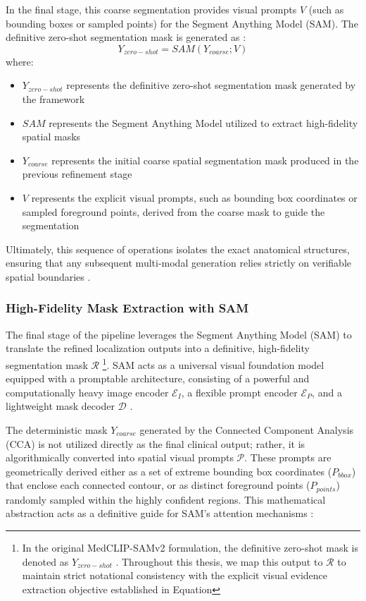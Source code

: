 In the final stage, this coarse segmentation provides visual prompts $V$ (such as bounding boxes or sampled points) for the Segment Anything Model (SAM). The definitive zero-shot segmentation mask is generated as \cite{medclipsam}:
\begin{equation}
Y_{zero-shot} = SAM(Y_{coarse}; V)
\end{equation}
where:
\begin{itemize}
\item $Y_{zero-shot}$ represents the definitive zero-shot segmentation mask generated by the framework
\item $SAM$ represents the Segment Anything Model utilized to extract high-fidelity spatial masks
\item $Y_{coarse}$ represents the initial coarse spatial segmentation mask produced in the previous refinement stage
\item $V$ represents the explicit visual prompts, such as bounding box coordinates or sampled foreground points, derived from the coarse mask to guide the segmentation
\end{itemize}
Ultimately, this sequence of operations isolates the exact anatomical structures, ensuring that any subsequent multi-modal generation relies strictly on verifiable spatial boundaries \cite{medclipsam}.

\subsubsection{High-Fidelity Mask Extraction with SAM}
\label{sec:sam}
The final stage of the pipeline leverages the Segment Anything Model (SAM) to translate the refined localization outputs into a definitive, high-fidelity segmentation mask $\mathcal{R}$ \footnote{In the original MedCLIP-SAMv2 formulation, the definitive zero-shot mask is denoted as $Y_{zero-shot}$ \cite{medclipsamv2}. Throughout this thesis, we map this output to $\mathcal{R}$ to maintain strict notational consistency with the explicit visual evidence extraction objective established in Equation }. SAM acts as a universal visual foundation model equipped with a promptable architecture, consisting of a powerful and computationally heavy image encoder $\mathcal{E}_{I}$, a flexible prompt encoder $\mathcal{E}_{P}$, and a lightweight mask decoder $\mathcal{D}$ \cite{medclipsam, medclipsamv2}.

The deterministic mask $Y_{coarse}$ generated by the Connected Component Analysis (CCA) is not utilized directly as the final clinical output; rather, it is algorithmically converted into spatial visual prompts $\mathcal{P}$. These prompts are geometrically derived either as a set of extreme bounding box coordinates ($P_{bbox}$) that enclose each connected contour, or as distinct foreground points ($P_{points}$) randomly sampled within the highly confident regions. This mathematical abstraction acts as a definitive guide for SAM's attention mechanisms \cite{medclipsam, medclipsamv2}:

